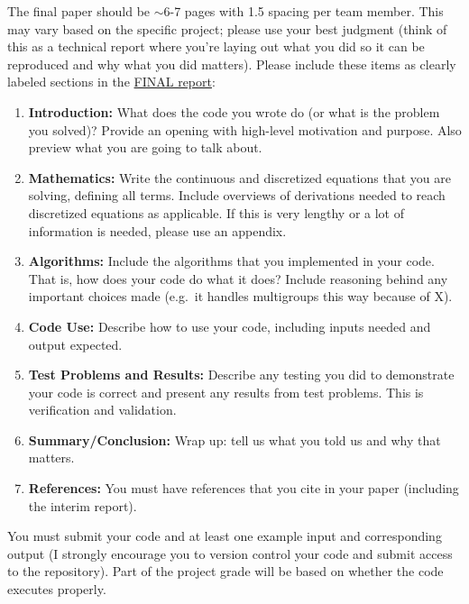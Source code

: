 \documentclass[12pt]{article}
\begin{document}
The final paper should be $\sim$6-7 pages with 1.5 spacing per team member. This may vary based on the specific project; please use your best judgment (think of this as a technical report where you're laying out what you did so it can be reproduced and why what you did matters). Please include these items as clearly labeled sections in the \underline{FINAL report}:
%
\begin{enumerate}
\item \textbf{Introduction:} What does the code you wrote do (or what is the problem you solved)? Provide an opening with high-level motivation and purpose. Also preview what you are going to talk about.

\item \textbf{Mathematics:} Write the continuous and discretized equations that you are solving, defining all terms. Include overviews of derivations needed to reach discretized equations as applicable. If this is very lengthy or a lot of information is needed, please use an appendix.

\item \textbf{Algorithms:} Include the algorithms that you implemented in your code. That is, how does your code do what it does? Include reasoning behind any important choices made (e.g.\ it handles multigroups this way because of X).

\item \textbf{Code Use:} Describe how to use your code, including inputs needed and output expected. 

\item \textbf{Test Problems and Results:} Describe any testing you did to demonstrate your code is correct and present any results from test problems. This is verification and validation.

\item \textbf{Summary/Conclusion:} Wrap up: tell us what you told us and why that matters.

\item \textbf{References:} You must have references that you cite in your paper (including the interim report).
\end{enumerate}

\vspace*{1em}
You must submit your code and at least one example input and corresponding output (I strongly encourage you to version control your code and submit access to the repository). Part of the project grade will be based on whether the code executes properly.
\end{document}
